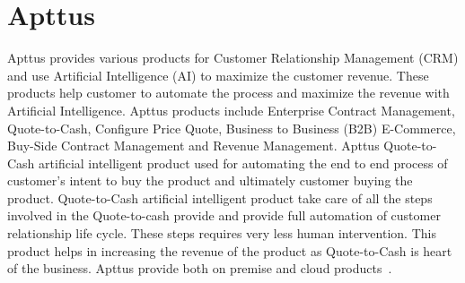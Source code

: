 \section{Apttus}

Apttus provides various products for Customer Relationship Management 
(CRM) and use Artificial Intelligence (AI) to 
maximize the customer revenue. These products help customer to 
automate the process and maximize the revenue with Artificial 
Intelligence. Apttus products include Enterprise Contract Management, 
Quote-to-Cash, Configure Price Quote, Business to
Business (B2B) E-Commerce, Buy-Side Contract Management and Revenue 
Management. Apttus Quote-to-Cash artificial 
intelligent product used for automating the end to end process of 
customer's intent to buy the product and ultimately customer buying 
the product. Quote-to-Cash artificial intelligent
product take care of all the steps involved in the 
Quote-to-cash provide and provide full automation
of customer relationship life cycle. These steps requires very less 
human intervention. This product helps in increasing the revenue of 
the product as Quote-to-Cash is heart of the 
business. Apttus provide both on premise and cloud 
products~\cite{hid-sp18-511-apttus}.
 
